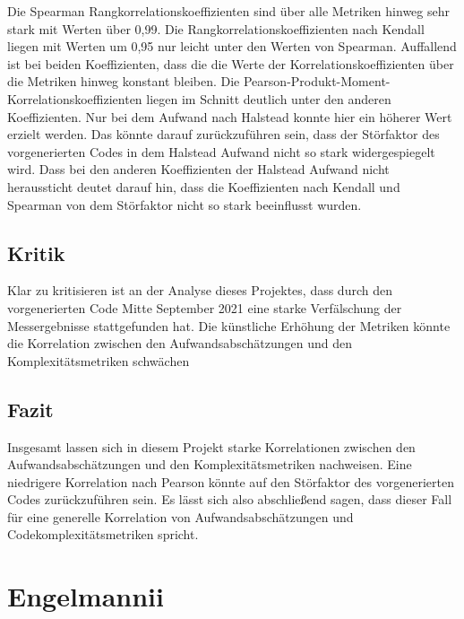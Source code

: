 Die Spearman Rangkorrelationskoeffizienten sind über alle Metriken
hinweg sehr stark mit Werten über 0,99. Die
Rangkorrelationskoeffizienten nach Kendall liegen mit Werten um 0,95 nur
leicht unter den Werten von Spearman. Auffallend ist bei beiden
Koeffizienten, dass die die Werte der Korrelationskoeffizienten über die
Metriken hinweg konstant bleiben. Die
Pearson-Produkt-Moment-Korrelationskoeffizienten liegen im Schnitt
deutlich unter den anderen Koeffizienten. Nur bei dem Aufwand nach
Halstead konnte hier ein höherer Wert erzielt werden. Das könnte darauf
zurückzuführen sein, dass der Störfaktor des vorgenerierten Codes in dem
Halstead Aufwand nicht so stark widergespiegelt wird. Dass bei den
anderen Koeffizienten der Halstead Aufwand nicht heraussticht deutet
darauf hin, dass die Koeffizienten nach Kendall und Spearman von dem
Störfaktor nicht so stark beeinflusst wurden.

\subsection{Kritik}\label{lm-kritik}

Klar zu kritisieren ist an der Analyse dieses Projektes, dass durch den
vorgenerierten Code Mitte September 2021 eine starke Verfälschung der
Messergebnisse stattgefunden hat. Die künstliche Erhöhung der Metriken
könnte die Korrelation zwischen den Aufwandsabschätzungen und den
Komplexitätsmetriken schwächen

\subsection{Fazit}\label{lm-fazit}

Insgesamt lassen sich in diesem Projekt starke Korrelationen zwischen
den Aufwandsabschätzungen und den Komplexitätsmetriken nachweisen. Eine
niedrigere Korrelation nach Pearson könnte auf den Störfaktor des
vorgenerierten Codes zurückzuführen sein. Es lässt sich also
abschließend sagen, dass dieser Fall für eine generelle Korrelation von
Aufwandsabschätzungen und Codekomplexitätsmetriken spricht.

\section{Engelmannii}\label{engelmannii}


